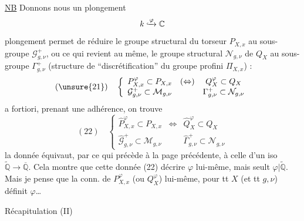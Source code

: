 \uline{NB} Donnons nous un plongement
\[k\lhook\joinrel\xrightarrow{\varphi}\mathbb C\]
 plongement permet de réduire le groupe structural
du torseur $P_{X,x}$  
au sous-groupe $\mathcal G_{g,\nu}^{+}$, ou ce qui revient au même, le groupe
structural $\mathcal N_{g,\nu}$ de $Q_X$ au sous-groupe $\Gamma_{g,\nu}^{+}$
(structure de ``discrétification''  du groupe profini
$\Pi_{X,x}$) : 
\[
(\unsure{21})\quad\left\{\begin{array}{ccc}
P_{X,x}^{\varphi}\subset P_{X,x}&(\Leftrightarrow)&Q_X^{\varphi}\subset Q_X\\
\mathcal G_{g,\nu}^{+}\subset\mathcal M_{g,\nu}&&\Gamma_{g,\nu}^{+}\subset\mathcal N_{g,\nu}
\end{array}\right.
\]
a fortiori, prenant une adhérence, on trouve
\[
(22)\quad\left\{\begin{array}{ccc}
\widehat P_{X,x}^{\varphi}\subset P_{X,x}&\Leftrightarrow&\widehat Q_X^{\varphi}\subset Q_X\\
\widehat{\mathcal G}_{g,\nu}^{+}\subset\mathcal M_{g,\nu}&&\widehat\Gamma_{g,\nu}^{+}\subset\mathcal N_{g,\nu}
\end{array}\right.
\]
 la donnée équivaut, par ce qui précède à la page précédente,
à celle d'un iso  $\widetilde{\mathbb Q}\longrightarrow\overline{\mathbb Q}$.
\unsure{\&} Cela montre que
cette donnée (22)  décrire $\varphi$ lui-même, mais seult
$\varphi|\widetilde{\mathbb Q}$.
Mais je pense que la conn. de \deleted{$\unsure{\varphi}$} $P_{X,x}^{\varphi}$
(ou $Q_X^{\varphi}$) lui-même, pour tt $X$ (et tt $g,\nu$) définit $\varphi$\ldots
{}

Récapitulation (II)


